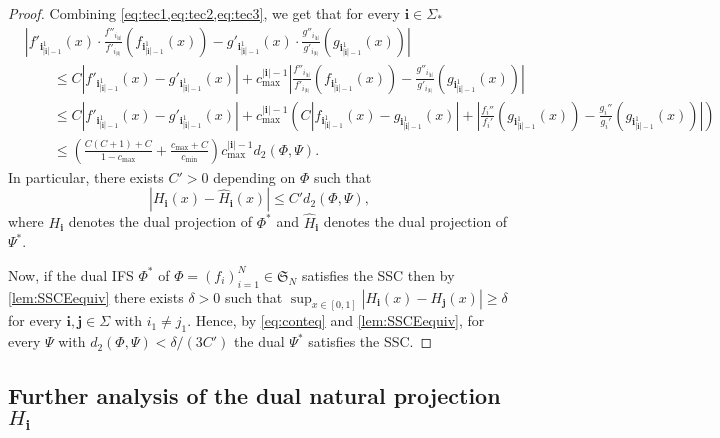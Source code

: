 \documentclass[12pt,]{article}
\def\cref#1{\ref{#1}}%
\theoremstyle{definition}
\theoremstyle{remark}
\newcommand{\0}{\mathbf{0}}
\newcommand{\bi}{\mathbf{i}}
\newcommand{\bj}{\mathbf{j}}
\begin{document}
\begin{proof}
	Combining \cref{eq:tec1,eq:tec2,eq:tec3}, we get that for every $\bi\in\Sigma_*$
\begin{align*}
&\left|
f'_{\bi_{|\bi|-1}^1}(x) \cdot 
\frac{f''_{i_{|\bi|}}}{f'_{i_{|\bi|}}}(f_{\bi_{|\bi|-1}^1}(x))-
g'_{\bi_{|\bi|-1}^1}(x) \cdot 
\frac{g''_{i_{|\bi|}}}{g'_{i_{|\bi|}}}(g_{\bi_{|\bi|-1}^1}(x))\right|\\
&\qquad\leq C |f'_{\bi_{|\bi|-1}^1}(x)-g'_{\bi_{|\bi|-1}^1}(x)|+c_{\max}^{|\bi|-1}\left|
\frac{f''_{i_{|\bi|}}}{f'_{i_{|\bi|}}}(f_{\bi_{|\bi|-1}^1}(x))-
\frac{g''_{i_{|\bi|}}}{g'_{i_{|\bi|}}}(g_{\bi_{|\bi|-1}^1}(x))\right|\\
&\qquad\leq C |f'_{\bi_{|\bi|-1}^1}(x)-g'_{\bi_{|\bi|-1}^1}(x)|+c_{\max}^{|\bi|-1}\left(C\left|f_{\bi_{|\bi|-1}^1}(x)-
g_{\bi_{|\bi|-1}^1}(x)\right|+\left|\frac{f_{i}''}{f_i'}(g_{\bi_{|\bi|-1}^1}(x))-\frac{g_{i}''}{g_i'}(g_{\bi_{|\bi|-1}^1}(x))\right|\right)\\
&\qquad\leq\left(\frac{C(C+1)+C}{1-c_{\max}}+\frac{c_{\max}+C}{c_{\min}}\right)c_{\max}^{|\bi|-1}d_2(\Phi,\Psi).
\end{align*}
In particular, there exists $C'>0$ depending on $\Phi$ such that
\begin{equation}\label{eq:conteq}
|H_{\bi}(x)-\hat{H}_{\bi}(x)|\leq C'd_2(\Phi,\Psi),
\end{equation}
where $H_{\bi}$ denotes the dual projection of $\Phi^*$ and $\hat{H}_{\bi}$ denotes the dual projection of $\Psi^*$.

Now, if the dual IFS $\Phi^*$ of $\Phi=(f_i)_{i=1}^N\in\mathfrak{S}_N$ satisfies the SSC then by \cref{lem:SSCEequiv} there exists $\delta>0$ such that 
	$\sup_{x\in[0,1]}|H_{\bi}(x)-H_{\bj}(x)|\geq\delta$ for every $\bi,\bj\in\Sigma$ with $i_1\neq j_1$. Hence, by \cref{eq:conteq} and \cref{lem:SSCEequiv}, for every $\Psi$ with $d_2(\Phi,\Psi)<\delta/(3C')$ the dual $\Psi^*$ satisfies the SSC.	
\end{proof}

\subsection{Further analysis of the dual natural projection \texorpdfstring{$H_{\bi}$}{H}}
\end{document}
